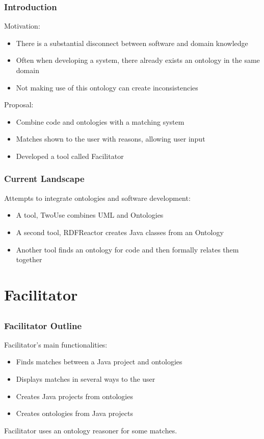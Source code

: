 \documentclass{beamer}
\begin{document}
\begin{frame}
  \frametitle{Introduction}
  Motivation:
  \begin{itemize}
    \item There is a substantial disconnect between software and domain knowledge
    \item Often when developing a system, there already exists an ontology in the same domain
    \item Not making use of this ontology can create inconsistencies
  \end{itemize}
  Proposal:
  \begin{itemize}
    \item Combine code and ontologies with a matching system
    \item Matches shown to the user with reasons, allowing user input
    \item Developed a tool called Facilitator
  \end{itemize}
\end{frame}

\begin{frame}
  \frametitle{Current Landscape}
  Attempts to integrate ontologies and software development:
  \begin{itemize}
	\item A tool, TwoUse combines UML and Ontologies
    \item A second tool, RDFReactor creates Java classes from an Ontology
    \item Another tool finds an ontology for code and then formally relates them together
  \end{itemize}
\end{frame}

\section{Facilitator}
\subsection{}

\begin{frame}
\frametitle{Facilitator Outline}
Facilitator's main functionalities:
\begin{itemize}
\item Finds matches between a Java project and ontologies
\item Displays matches in several ways to the user
\item Creates Java projects from ontologies
\item Creates ontologies from Java projects
\end{itemize}
Facilitator uses an ontology reasoner for some matches.
\end{frame}
\end{document}
